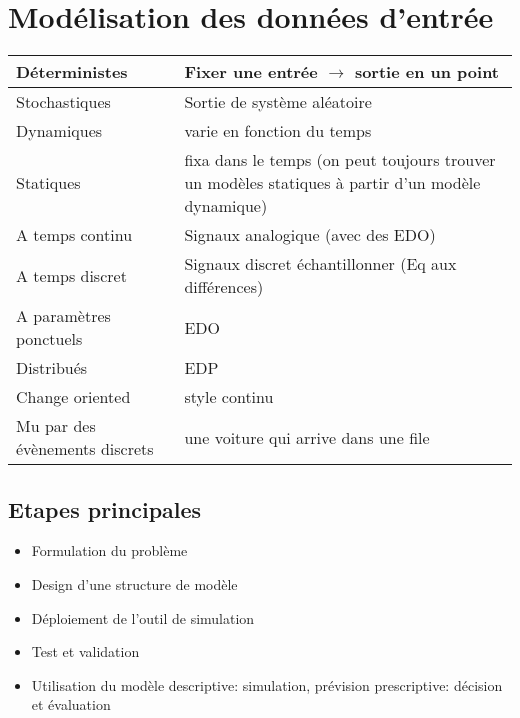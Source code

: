 \documentclass[resume]{subfiles}
\begin{document}
\section{Modélisation des données d'entrée}
\begin{table}[H]
\centering
    \begin{tabular}{p{3cm}p{4cm}}
    \hline
Déterministes                  & Fixer une entrée $\rightarrow$ sortie en un point \\
\hline
Stochastiques                  & Sortie de système aléatoire\\
\hline
Dynamiques                     & varie en fonction du temps\\
\hline
Statiques                      & fixa dans le temps (on peut toujours trouver un 
modèles statiques à partir d'un modèle dynamique)\\
\hline
A temps continu                & Signaux analogique (avec des EDO)\\
\hline
A temps discret                & Signaux discret échantillonner (Eq aux 
différences)\\
\hline
A paramètres ponctuels         & EDO\\
\hline
Distribués                     & EDP\\
\hline
Change oriented                & style continu\\
\hline
Mu par des évènements discrets & une voiture qui arrive dans une file\\
 \hline
    \end{tabular}
\end{table}

\subsection{Etapes principales}
\begin{itemize}
\item Formulation du problème
\item Design d'une structure de modèle
\item Déploiement de l'outil de simulation
\item Test et validation
\item Utilisation du modèle
\subitem descriptive: simulation, prévision
\subitem prescriptive: décision et évaluation  
\end{itemize}
\end{document}
